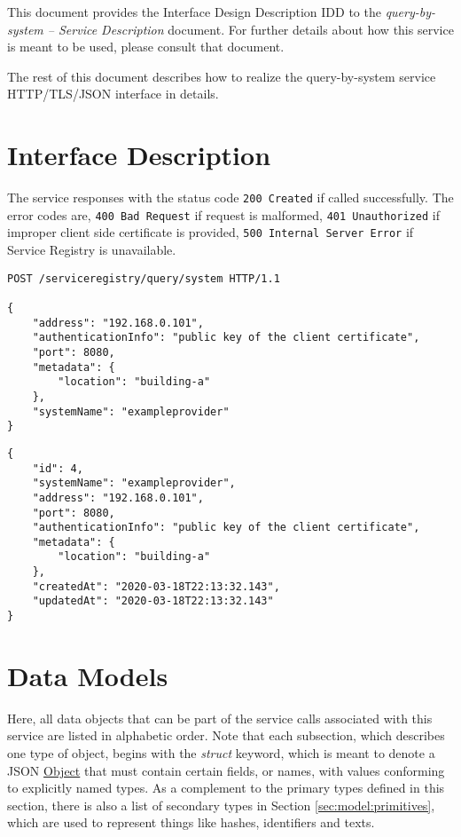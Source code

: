 \documentclass[a4paper]{arrowhead}
\newcommand{\fref}[1]{{\textcolor{ArrowheadBlue}{\hyperref[sec:functions:#1]{#1}}}}
\newcommand{\pref}[1]{{\textcolor{ArrowheadGrey}{\hyperref[sec:model:primitives:#1]{#1}}}}
\begin{document}
This document provides the Interface Design Description IDD to the \textit{query-by-system -- Service Description} document.
For further details about how this service is meant to be used, please consult that document.

The rest of this document describes how to realize the query-by-system service HTTP/TLS/JSON interface in details.

\newpage

\section{Interface Description}
\label{sec:functions}

The service responses with the status code \texttt{200
  Created} if called successfully. The error codes are, \texttt{400
  Bad Request} if request is malformed, \texttt{401 Unauthorized} if
improper client side certificate is provided, \texttt{500 Internal
  Server Error} if Service Registry is unavailable.

\begin{lstlisting}[language=http,label={lst:register},caption={A \fref{query-by-system} invocation.}]
POST /serviceregistry/query/system HTTP/1.1

{
    "address": "192.168.0.101",
    "authenticationInfo": "public key of the client certificate",
    "port": 8080,
    "metadata": {
        "location": "building-a"
    },
    "systemName": "exampleprovider"
}
\end{lstlisting}

\begin{lstlisting}[language=http,label={lst:register_response},caption={A \fref{query-by-system} response.}]
{
    "id": 4,
    "systemName": "exampleprovider",
    "address": "192.168.0.101",
    "port": 8080,
    "authenticationInfo": "public key of the client certificate",
    "metadata": {
        "location": "building-a"
    },
    "createdAt": "2020-03-18T22:13:32.143",
    "updatedAt": "2020-03-18T22:13:32.143"
}
\end{lstlisting}

\newpage

\section{Data Models}
\label{sec:model}

Here, all data objects that can be part of the service calls associated with this service are listed in alphabetic order.
Note that each subsection, which describes one type of object, begins with the \textit{struct} keyword, which is meant to denote a JSON \pref{Object} that must contain certain fields, or names, with values conforming to explicitly named types.
As a complement to the primary types defined in this section, there is also a list of secondary types in Section \ref{sec:model:primitives}, which are used to represent things like hashes, identifiers and texts.
\end{document}
